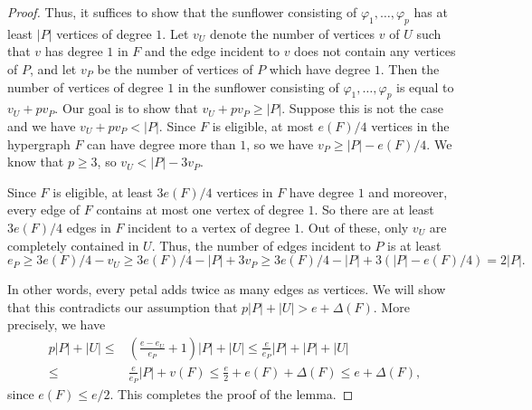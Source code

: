 \documentclass[10pt,a4paper]{amsart}
\begin{document}
\begin{proof}
Thus, it suffices to show that the sunflower consisting of $\varphi_1, \dots, \varphi_p$ has at least $|P|$ vertices of degree $1$. Let $v_U$ denote the number of vertices $v$ of $U$ such that $v$ has degree $1$ in $F$ and the edge incident to $v$ does not contain any vertices of $P$, and let $v_P$ be the number of vertices of $P$ which have degree $1$. Then the number of vertices of degree $1$ in the sunflower consisting of $\varphi_1,\dots,\varphi_p$ is equal to $v_U+pv_P$. Our goal is to show that $v_U+pv_P\geq |P|$. Suppose this is not the case and we have $v_U+pv_P<|P|$. Since $F$ is eligible, at most $e(F)/4$ vertices in the hypergraph $F$ can have degree more than $1$, so we have $v_P\geq |P|-e(F)/4$. We know that $p\geq 3$, so $v_U <  |P|-3v_P$.

Since $F$ is eligible, at least $3e(F)/4$ vertices in $F$ have degree $1$ and moreover, every edge of $F$ contains at most one vertex of degree $1$. So there are at least $3e(F)/4$ edges in $F$ incident to a vertex of degree $1$. Out of these, only $v_U$ are completely contained in $U$. Thus, the number of edges incident to $P$ is at least \[e_P\geq 3e(F)/4-v_U\geq 3e(F)/4-|P|+3v_P\geq 3e(F)/4-|P|+3(|P|-e(F)/4)=2|P|.\] 

In other words, every petal adds twice as many edges as vertices. We will show that this contradicts our assumption that $p|P| + |U| > e + \Delta(F)$. More precisely, we have 
\begin{align*}
p|P|+|U|\leq &\left(\frac{e-e_U}{e_P}+1\right)|P| +|U|\leq \frac{e}{e_P}|P|+|P|+|U|\\
\leq & \frac{e}{e_P}|P|+v(F)\leq \frac{e}{2}+e(F)+\Delta(F)\leq e+\Delta(F),
\end{align*}
since $e(F) \le e/2$. This completes the proof of the lemma.
\end{proof}
\end{document}
